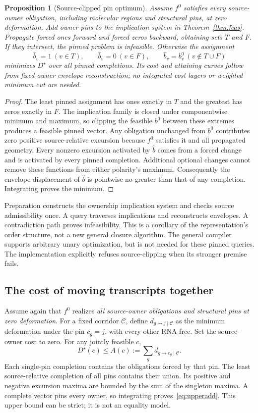 \documentclass[10pt,letterpaper]{article}
\newtheorem{proposition}[theorem]{Proposition}
\begin{document}
\begin{proposition}[Source-clipped pin optimum]\label{prop:pin}
Assume $f^0$ satisfies \emph{every source-owner obligation}, including molecular regions and structural pins, at zero deformation. Add owner pins to the implication system in Theorem~\ref{thm:feas}. Propagate forced ones forward and forced zeros backward, obtaining sets $T$ and $F$. If they intersect, the pinned problem is infeasible. Otherwise the assignment
\[
 \widehat b_v=1\ (v\in T),\qquad \widehat b_v=0\ (v\in F),\qquad
 \widehat b_v=b_v^0\ (v\notin T\cup F)
\]
minimizes $D^\star$ over all pinned completions. Its cost and attaining curves follow from fixed-owner envelope reconstruction; no integrated-cost layers or weighted minimum cut are needed.
\end{proposition}
\begin{proof}
The least pinned assignment has ones exactly in $T$ and the greatest has zeros exactly in $F$. The implication family is closed under componentwise minimum and maximum, so clipping the feasible $b^0$ between these extremes produces a feasible pinned vector. Any obligation unchanged from $b^0$ contributes zero positive source-relative excursion because $f^0$ satisfies it and all propagated geometry. Every nonzero excursion activated by $\widehat b$ comes from a forced change and is activated by every pinned completion. Additional optional changes cannot remove these functions from either polarity's maximum. Consequently the envelope displacement of $\widehat b$ is pointwise no greater than that of any completion. Integrating proves the minimum.
\end{proof}
Preparation constructs the ownership implication system and checks source admissibility once. A query traverses implications and reconstructs envelopes. A contradiction path proves infeasibility. This is a corollary of the representation's order structure, not a new general closure algorithm. The general compiler supports arbitrary unary optimization, but is not needed for these pinned queries. The implementation explicitly refuses source-clipping when its stronger premise fails.

\subsection{The cost of moving transcripts together}
Assume again that $f^0$ realizes \emph{all source-owner obligations and structural pins at zero deformation}. For a fixed corridor $\mathcal C$, define $d_{g\to j\mid\mathcal C}$ as the minimum deformation under the pin $c_g=j$, with every other RNA free. Set the source-owner cost to zero. For any jointly feasible $c$,
\begin{equation}
 D^\star(c)\le A(c):=\sum_g d_{g\to c_g\mid\mathcal C}.\label{eq:upperadd}
\end{equation}
Each single-pin completion contains the obligations forced by that pin. The least source-relative completion of all pins contains their union. Its positive and negative excursion maxima are bounded by the sum of the singleton maxima. A complete vector pins every owner, so integrating proves~\eqref{eq:upperadd}. This upper bound can be strict; it is not an equality model.
\end{document}

